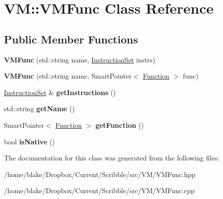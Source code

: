 \hypertarget{class_v_m_1_1_v_m_func}{\section{V\-M\-:\-:V\-M\-Func Class Reference}
\label{class_v_m_1_1_v_m_func}
}
\subsection*{Public Member Functions}
\begin{DoxyCompactItemize}
\item 
\hypertarget{class_v_m_1_1_v_m_func_a0114d88baad8dcb20fb384729281fbc3}{{\bfseries V\-M\-Func} (std\-::string name, \hyperlink{class_v_m_1_1_instruction_set}{Instruction\-Set} instrs)}\label{class_v_m_1_1_v_m_func_a0114d88baad8dcb20fb384729281fbc3}

\item 
\hypertarget{class_v_m_1_1_v_m_func_ad659867a1da409ca7f6e9aff3b6acf63}{{\bfseries V\-M\-Func} (std\-::string name, Smart\-Pointer$<$ \hyperlink{class_a_p_i_1_1_function}{Function} $>$ func)}\label{class_v_m_1_1_v_m_func_ad659867a1da409ca7f6e9aff3b6acf63}

\item 
\hypertarget{class_v_m_1_1_v_m_func_aef9affb9a368a8d1e49a3aae46fd638c}{\hyperlink{class_v_m_1_1_instruction_set}{Instruction\-Set} \& {\bfseries get\-Instructions} ()}\label{class_v_m_1_1_v_m_func_aef9affb9a368a8d1e49a3aae46fd638c}

\item 
\hypertarget{class_v_m_1_1_v_m_func_a6d7750752139b2c6f1adbcb2581d4702}{std\-::string {\bfseries get\-Name} ()}\label{class_v_m_1_1_v_m_func_a6d7750752139b2c6f1adbcb2581d4702}

\item 
\hypertarget{class_v_m_1_1_v_m_func_ad7b9b38451331843d019b4d1936a0bfa}{Smart\-Pointer$<$ \hyperlink{class_a_p_i_1_1_function}{Function} $>$ {\bfseries get\-Function} ()}\label{class_v_m_1_1_v_m_func_ad7b9b38451331843d019b4d1936a0bfa}

\item 
\hypertarget{class_v_m_1_1_v_m_func_afde38a68b74e9ff0c191ec178354e55f}{bool {\bfseries is\-Native} ()}\label{class_v_m_1_1_v_m_func_afde38a68b74e9ff0c191ec178354e55f}

\end{DoxyCompactItemize}


The documentation for this class was generated from the following files\-:\begin{DoxyCompactItemize}
\item 
/home/blake/\-Dropbox/\-Current/\-Scribble/src/\-V\-M/V\-M\-Func.\-hpp\item 
/home/blake/\-Dropbox/\-Current/\-Scribble/src/\-V\-M/V\-M\-Func.\-cpp\end{DoxyCompactItemize}
